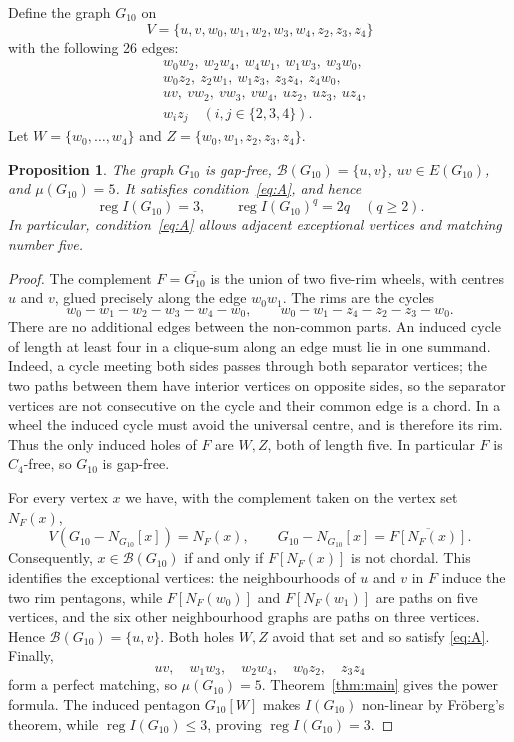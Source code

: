 \documentclass[11pt,a4paper]{article}
\newtheorem{proposition}[theorem]{Proposition}
\theoremstyle{remark}\newtheorem{remark}[theorem]{Remark}
\newcommand{\reg}{\operatorname{reg}}
\newcommand{\Bad}{\mathcal B}
\begin{document}
Define the graph $G_{10}$ on
\[ V=\{u,v,w_0,w_1,w_2,w_3,w_4,z_2,z_3,z_4\} \]
with the following 26 edges:
\begin{align*}
 &w_0w_2,\ w_2w_4,\ w_4w_1,\ w_1w_3,\ w_3w_0,\\
 &w_0z_2,\ z_2w_1,\ w_1z_3,\ z_3z_4,\ z_4w_0,\\
 &uv,\ vw_2,\ vw_3,\ vw_4,\ uz_2,\ uz_3,\ uz_4,\\
 &w_i z_j\quad(i,j\in\{2,3,4\}).
\end{align*}
Let $W=\{w_0,\ldots,w_4\}$ and $Z=\{w_0,w_1,z_2,z_3,z_4\}$.
\begin{proposition}\label{prop:G10}
The graph $G_{10}$ is gap-free, $\Bad(G_{10})=\{u,v\}$, $uv\in E(G_{10})$, and $\mu(G_{10})=5$. It satisfies condition~\eqref{eq:A}, and hence
\[
 \reg I(G_{10})=3,\qquad \reg I(G_{10})^q=2q\quad(q\ge2).
\]
In particular, condition~\eqref{eq:A} allows adjacent exceptional vertices and matching number five.
\end{proposition}
\begin{proof}
The complement $F=\overline{G_{10}}$ is the union of two five-rim wheels, with centres $u$ and $v$, glued precisely along the edge $w_0w_1$. The rims are the cycles
\[
 w_0-w_1-w_2-w_3-w_4-w_0,\qquad
 w_0-w_1-z_4-z_2-z_3-w_0.
\]
There are no additional edges between the non-common parts. An induced cycle of length at least four in a clique-sum along an edge must lie in one summand. Indeed, a cycle meeting both sides passes through both separator vertices; the two paths between them have interior vertices on opposite sides, so the separator vertices are not consecutive on the cycle and their common edge is a chord. In a wheel the induced cycle must avoid the universal centre, and is therefore its rim. Thus the only induced holes of $F$ are $W,Z$, both of length five. In particular $F$ is $C_4$-free, so $G_{10}$ is gap-free.

For every vertex $x$ we have, with the complement taken on the vertex set $N_F(x)$,
\[
 V(G_{10}-N_{G_{10}}[x])=N_F(x),\qquad
 G_{10}-N_{G_{10}}[x]=\overline{F[N_F(x)]}.
\]
Consequently, $x\in\Bad(G_{10})$ if and only if $F[N_F(x)]$ is not chordal. This identifies the exceptional vertices: the neighbourhoods of $u$ and $v$ in $F$ induce the two rim pentagons, while $F[N_F(w_0)]$ and $F[N_F(w_1)]$ are paths on five vertices, and the six other neighbourhood graphs are paths on three vertices. Hence $\Bad(G_{10})=\{u,v\}$. Both holes $W,Z$ avoid that set and so satisfy \eqref{eq:A}. Finally,
\[
 uv,\quad w_1w_3,\quad w_2w_4,\quad w_0z_2,\quad z_3z_4
\]
form a perfect matching, so $\mu(G_{10})=5$. Theorem~\ref{thm:main} gives the power formula. The induced pentagon $G_{10}[W]$ makes $I(G_{10})$ non-linear by Fr\"oberg's theorem, while $\reg I(G_{10})\le3$, proving $\reg I(G_{10})=3$.
\end{proof}
\end{document}
